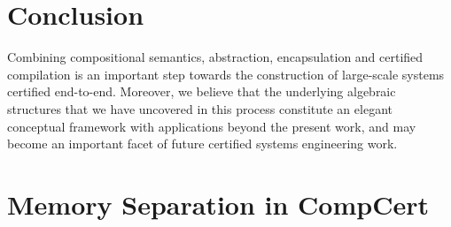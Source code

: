 \documentclass[acmsmall,screen,review,anonymous]{acmart}
\begin{document}

%
%
%


\section{Conclusion} %

Combining compositional semantics,
abstraction,
encapsulation and certified compilation
is an important step towards
the construction of large-scale systems certified end-to-end.
Moreover,
we believe that
the underlying algebraic structures that we have uncovered
in this process
constitute an elegant conceptual framework
with applications beyond the present work,
and may become an important facet of
future certified systems engineering work.




\ifdefined\withappendix

\appendix

\newpage

\section{Memory Separation in CompCert} \label{app:sep} %

\end{document}
